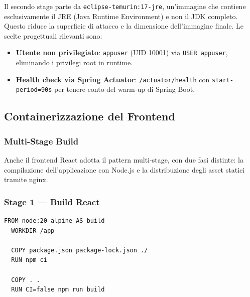 \documentclass[12pt, a4paper]{article}
\begin{document}
    Il secondo stage parte da \texttt{eclipse-temurin:17-jre}, un'immagine che contiene
    esclusivamente il JRE (Java Runtime Environment) e non il JDK completo. Questo riduce
    la superficie di attacco e la dimensione dell'immagine finale. Le scelte progettuali
    rilevanti sono:

    \begin{itemize}
        \item \textbf{Utente non privilegiato}: \texttt{appuser} (UID 10001) via
        \texttt{USER appuser}, eliminando i privilegi root in runtime.
        \item \textbf{Health check via Spring Actuator}: \texttt{/actuator/health}
        con \texttt{start-period=90s} per tenere conto del warm-up di Spring Boot.
    \end{itemize}

    \subsection{Containerizzazione del Frontend}

    \subsubsection{Multi-Stage Build}

    Anche il frontend React adotta il pattern multi-stage, con due fasi distinte: la
    compilazione dell'applicazione con Node.js e la distribuzione degli asset statici
    tramite nginx.

    \subsubsection{Stage 1 — Build React}

    \begin{lstlisting}[language=bash, caption={Frontend Dockerfile — Stage di build}]
  FROM node:20-alpine AS build
  WORKDIR /app

  COPY package.json package-lock.json ./
  RUN npm ci

  COPY . .
  RUN CI=false npm run build
    \end{lstlisting}
\end{document}

